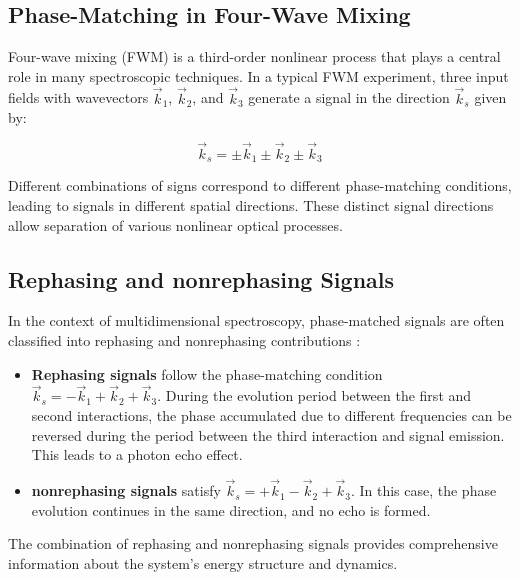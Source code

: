 \subsection{Phase-Matching in Four-Wave Mixing}
\label{subsec:fwm_phase_matching}

\noindent Four-wave mixing (FWM) is a third-order nonlinear process that plays a central role in many spectroscopic techniques. In a typical FWM experiment, three input fields with wavevectors $\vec{k}_1$, $\vec{k}_2$, and $\vec{k}_3$ generate a signal in the direction $\vec{k}_s$ given by:

\begin{equation}
	\vec{k}_s = \pm\vec{k}_1 \pm\vec{k}_2 \pm\vec{k}_3
	\label{eq:fwm_phase_matching}
\end{equation}

\noindent Different combinations of signs correspond to different phase-matching conditions, leading to signals in different spatial directions. These distinct signal directions allow separation of various nonlinear optical processes.

\subsection{Rephasing and nonrephasing Signals}
\label{subsec:rephasing_nonrephasing}

\noindent In the context of multidimensional spectroscopy, phase-matched signals are often classified into rephasing and nonrephasing contributions \cite{cho2009twodimensionalopticalspectroscopy, jonas2003twodimensionalfemtosecondspectroscopy}:

\begin{itemize}
	\item \textbf{Rephasing signals} follow the phase-matching condition $\vec{k}_s = -\vec{k}_1 + \vec{k}_2 + \vec{k}_3$. During the evolution period between the first and second interactions, the phase accumulated due to different frequencies can be reversed during the period between the third interaction and signal emission. This leads to a photon echo effect.

	\item \textbf{nonrephasing signals} satisfy $\vec{k}_s = +\vec{k}_1 - \vec{k}_2 + \vec{k}_3$. In this case, the phase evolution continues in the same direction, and no echo is formed.
\end{itemize}

\noindent The combination of rephasing and nonrephasing signals provides comprehensive information about the system's energy structure and dynamics.

